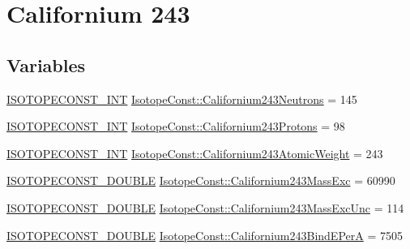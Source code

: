 \hypertarget{group___isotope_const-_californium-_cf243}{}\section{Californium 243}
\label{group___isotope_const-_californium-_cf243}
\subsection*{Variables}
\begin{DoxyCompactItemize}
\item 
\mbox{\hyperlink{group___isotope_const-_macros_ga5f18360b3e99483a35c32d789e62621c}{I\+S\+O\+T\+O\+P\+E\+C\+O\+N\+S\+T\+\_\+\+I\+NT}} \mbox{\hyperlink{group___isotope_const-_californium-_cf243_gaded1ca440290e7cc92f084cd04a0d3a5}{Isotope\+Const\+::\+Californium243\+Neutrons}} = 145
\item 
\mbox{\hyperlink{group___isotope_const-_macros_ga5f18360b3e99483a35c32d789e62621c}{I\+S\+O\+T\+O\+P\+E\+C\+O\+N\+S\+T\+\_\+\+I\+NT}} \mbox{\hyperlink{group___isotope_const-_californium-_cf243_ga1e7c20d1537035c728288aaf169a5b1b}{Isotope\+Const\+::\+Californium243\+Protons}} = 98
\item 
\mbox{\hyperlink{group___isotope_const-_macros_ga5f18360b3e99483a35c32d789e62621c}{I\+S\+O\+T\+O\+P\+E\+C\+O\+N\+S\+T\+\_\+\+I\+NT}} \mbox{\hyperlink{group___isotope_const-_californium-_cf243_gaab536d37c126969c32b6f47417fe2829}{Isotope\+Const\+::\+Californium243\+Atomic\+Weight}} = 243
\item 
\mbox{\hyperlink{group___isotope_const-_macros_ga8f45a7272ce02c0b4c65c44636ed719a}{I\+S\+O\+T\+O\+P\+E\+C\+O\+N\+S\+T\+\_\+\+D\+O\+U\+B\+LE}} \mbox{\hyperlink{group___isotope_const-_californium-_cf243_ga680b71d8c478ed4c906c50ca887f9c02}{Isotope\+Const\+::\+Californium243\+Mass\+Exc}} = 60990
\item 
\mbox{\hyperlink{group___isotope_const-_macros_ga8f45a7272ce02c0b4c65c44636ed719a}{I\+S\+O\+T\+O\+P\+E\+C\+O\+N\+S\+T\+\_\+\+D\+O\+U\+B\+LE}} \mbox{\hyperlink{group___isotope_const-_californium-_cf243_ga6e1a38236c25329a27e13e2a3f767e7e}{Isotope\+Const\+::\+Californium243\+Mass\+Exc\+Unc}} = 114
\item 
\mbox{\hyperlink{group___isotope_const-_macros_ga8f45a7272ce02c0b4c65c44636ed719a}{I\+S\+O\+T\+O\+P\+E\+C\+O\+N\+S\+T\+\_\+\+D\+O\+U\+B\+LE}} \mbox{\hyperlink{group___isotope_const-_californium-_cf243_gac9f781a6bfca49b7ca631bf1c7eb550a}{Isotope\+Const\+::\+Californium243\+Bind\+E\+PerA}} = 7505
\item 

\end{DoxyCompactItemize}
